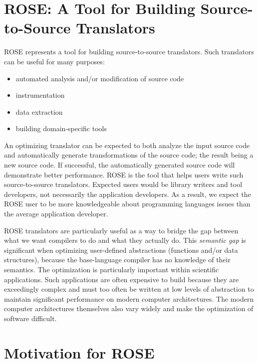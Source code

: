 
\section{ROSE: A Tool for Building Source-to-Source Translators}

   ROSE represents a tool for building source-to-source translators.
Such translators can be useful for many purposes:
\begin{itemize}
   \item automated analysis and/or modification of source code
   \item instrumentation
   \item data extraction
   \item building domain-specific tools
\end{itemize}
An optimizing translator can be expected to both analyze the input 
source code and automatically generate transformations of the source code; the
result being a new source code. If successful, the automatically generated source 
code will demonstrate better performance.  ROSE is the tool that helps users write
such source-to-source translators.  Expected users would be library writers and
tool developers, not necessarily the application developers.  As a result, we expect
the ROSE user to be more knowledgeable about programming languages issues than the 
average application developer.

ROSE translators are particularly useful as a way to bridge the gap between what we want
compilers to do and what they actually do.  This {\em semantic gap} is significant when
optimizing user-defined abstractions (functions and/or data structures), because the
base-language compiler has no knowledge of their semantics.  The optimization
is particularly important within scientific applications.  Such applications are often
expensive to build because they are exceedingly complex and must too often be
written at low levels of abstraction to maintain significant performance on
modern computer architectures.  The modern computer architectures themselves also
vary widely and make the optimization of software difficult.

\section{Motivation for ROSE}


